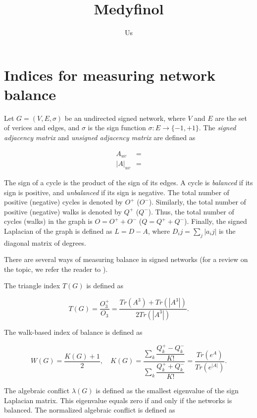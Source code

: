 \documentclass[10pt]{article}
\begin{document}
	
\title{Medyfinol}
\author{\small{Us}}


\section{Indices for measuring network balance}

Let $G = (V, E, \sigma)$ be an undirected signed network, where $V$ and $E$ are the set of verices and edges, and $\sigma$ is the sign function $\sigma: E \rightarrow \lbrace -1, +1\rbrace$. The \emph{signed adjacency matrix} and \emph{unsigned adjacency matrix} are defined as 

\begin{align}
A_{uv} &= \\
|A|_{uv} &= 
\end{align}

The sign of a cycle is the product of the sign of its edges. A cycle is \emph{balanced} if its sign is positive, and \emph{unbalanced} if its sign is negative. The total number of positive (negative) cycles is denoted by $O^{+}$ ($O^{-}$). Similarly, the total number of positive (negative) walks is denoted by  $Q^{+}$ ($Q^{-}$). Thus, the total number of cycles (walks) in the graph is $O = O^{+} + O^{-}$ ($Q = Q^{+} + Q^{-}$). Finally, the signed Laplacian of the graph is defined as $L = D-A$, where $D_ij = \sum_j |a_ij|$ is the diagonal matrix of degrees. 

There are several ways of measuring balance in signed networks (for a review on the topic, we refer the reader to \cite{Aref2017}).

The triangle index $T(G)$  is defined as 

\begin{equation}
T(G) = \dfrac{O^+_3}{O_3} = \dfrac{Tr(A^3) + Tr(|A^3|)}{2Tr(|A^3|)}.
\end{equation}

The walk-based index of balance is defined as 

\begin{equation}
W(G) = \dfrac{K(G) + 1}{2}, \quad K(G) = \dfrac{\sum_k\dfrac{Q^{+}_k - Q^{-}_k}{K!}}{\sum_k\dfrac{Q^{+}_k + Q^{-}_k}{K!}} = \dfrac{Tr(e^{A})}{Tr(e^{|A|})}.
\end{equation}

The algebraic conflict $\lambda(G)$ is defined as the smallest eigenvalue of the sign Laplacian matrix. This eigenvalue equals zero if and only if the networks is balanced. The normalized algebraic conflict is defined as 
\end{document}
